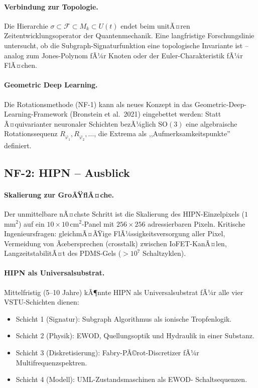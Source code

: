 ﻿\documentclass[a4paper,12pt]{scrreprt}
\theoremstyle{definition}
\begin{document}
\paragraph{Verbindung zur Topologie.}
Die Hierarchie $\sigma \subset \mathcal{F} \subset M_k \subset U(t)$
endet beim unitÃ¤ren Zeitentwicklungsoperator der Quantenmechanik.
Eine langfristige Forschungslinie untersucht, ob die
Subgraph-Signaturfunktion eine topologische Invariante ist -- analog
zum Jones-Polynom fÃ¼r Knoten oder der Euler-Charakteristik fÃ¼r FlÃ¤chen.

\paragraph{Geometric Deep Learning.}
Die Rotationsmethode (NF-1) kann als neues Konzept in das
Geometric-Deep-Learning-Framework (Bronstein et al.\ 2021)
eingebettet werden: Statt Ã¤qui\-varianter neuronaler Schichten
bezÃ¼glich $\mathrm{SO}(3)$ eine algebraische Rotationssequenz
$R_{\varphi_1}, R_{\varphi_2}, \ldots$, die Extrema als
,,Aufmerksamkeitspunkte'' definiert.

\subsection*{NF-2: HIPN -- Ausblick}

\paragraph{Skalierung zur GroÃŸflÃ¤che.}
Der unmittelbare nÃ¤chste Schritt ist die Skalierung des HIPN-Einzelpixels
($1$\,mm$^2$) auf ein $10\times 10$\,cm$^2$-Panel mit
$256 \times 256$ adressierbaren Pixeln. Kritische
Ingenieursfragen: gleichmÃ¤ÃŸige FlÃ¼ssigkeitsversorgung aller Pixel,
Vermeidung von Ãœbersprechen (crosstalk) zwischen IoFET-KanÃ¤len,
LangzeitstabilitÃ¤t des PDMS-Gels ($> 10^7$ Schaltzyklen).

\paragraph{HIPN als Universalsubstrat.}
Mittelfristig (5--10 Jahre) kÃ¶nnte HIPN als Universalsubstrat fÃ¼r alle
vier VSTU-Schichten dienen:
\begin{itemize}
  \item Schicht 1 (Signatur): Subgraph Algorithmus als ionische
    Tropfenlogik.
  \item Schicht 2 (Physik): EWOD, Quellungsoptik und Hydraulik in
    einer Substanz.
  \item Schicht 3 (Diskretisierung): Fabry-PÃ©rot-Discretizer
    fÃ¼r Multifrequenzspektren.
  \item Schicht 4 (Modell): UML-Zustandsmaschinen als EWOD-
    Schaltsequenzen.
\end{itemize}
\end{document}
